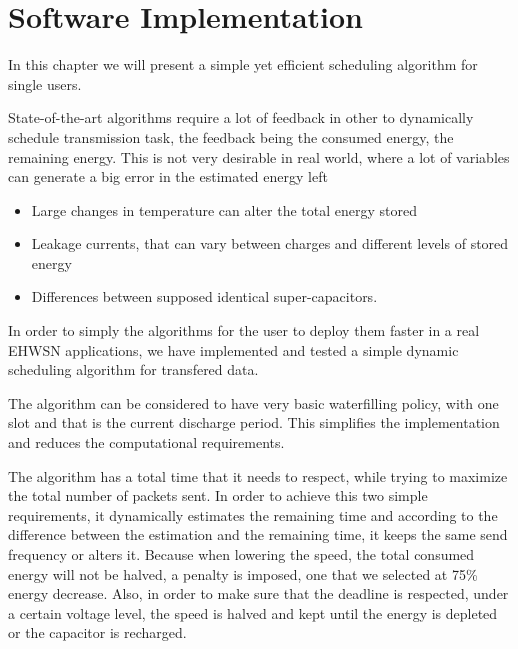 \normalfont\normalsize
\chapter{Software Implementation}

In this chapter we will present a simple yet efficient scheduling algorithm for single users.

State-of-the-art algorithms require a lot of feedback in other to dynamically schedule transmission
task, the feedback being the consumed energy, the remaining energy. This is not very desirable
in real world, where a lot of variables can generate a big error in the estimated energy left
\begin{itemize}
    \item Large changes in temperature can alter the total energy stored
    \item Leakage currents, that can vary between charges and different levels of stored energy
    \item Differences between supposed identical super-capacitors.
\end{itemize}

In order to simply the algorithms for the user to deploy them faster in a real EHWSN applications,
we have implemented and tested a simple dynamic scheduling algorithm for transfered data.

The algorithm can be considered to have very basic waterfilling policy, with one slot and that is
the current discharge period. This simplifies the implementation and reduces the computational
requirements.

The algorithm has a total time that it needs to respect, while trying to maximize the total number
of packets sent. In order to achieve this two simple requirements, it dynamically estimates the
remaining time and according to the difference between the estimation and the remaining time, it
keeps the same send frequency or alters it. Because when lowering the speed, the total consumed
energy will not be halved, a penalty is imposed, one that we selected at 75\% energy decrease.
Also, in order to make sure that the deadline is respected, under a certain voltage level, the
speed is halved and kept until the energy is depleted or the capacitor is recharged.

